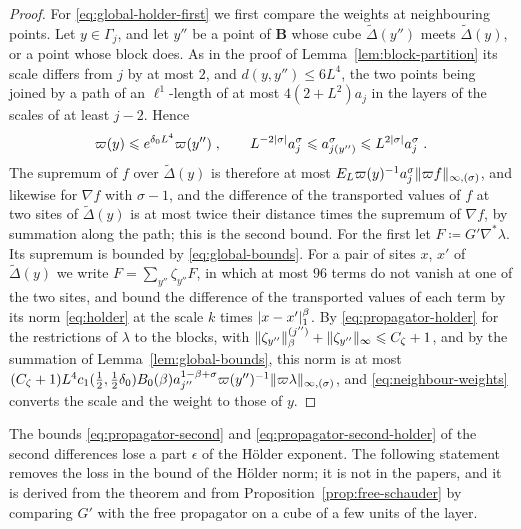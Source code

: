 \documentclass[11pt]{preprint}
\DeclarePairedDelimiter{\abs}{\lvert}{\rvert}
\DeclarePairedDelimiter{\norm}{\lVert}{\rVert}
\numberwithin{equation}{section}
\begin{document}
\begin{proof}
For \eqref{eq:global-holder-first} we first compare the weights at neighbouring points. Let $y \in \Gamma_j$, and let $y''$ be a point of $\mathbf B$ whose cube $\tilde\Delta(y'')$ meets $\tilde\Delta(y)$, or a point whose block does. As in the proof of Lemma~\ref{lem:block-partition} its scale differs from $j$ by at most $2$, and $d(y, y'') \leqslant 6L^4$, the two points being joined by a path of an $\ell^1$-length of at most $4(2 + L^2)a_j$ in the layers of the scales of at least $j - 2$. Hence
\begin{equation}\label{eq:neighbour-weights}
    \varpi(y) \leqslant e^{\delta_0L^4}\varpi(y'')\;,
    \qquad
    L^{-2\abs\sigma}a_j^\sigma \leqslant a_{j(y'')}^\sigma \leqslant L^{2\abs\sigma}a_j^\sigma\;.
\end{equation}
The supremum of $f$ over $\tilde\Delta(y)$ is therefore at most $E_L\varpi(y)^{-1}a_j^\sigma\norm{\varpi f}_{\infty,(\sigma)}$, and likewise for $\nabla f$ with $\sigma - 1$, and the difference of the transported values of $f$ at two sites of $\tilde\Delta(y)$ is at most twice their distance times the supremum of $\nabla f$, by summation along the path; this is the second bound. For the first let $F \coloneqq G'\nabla^*\lambda$. Its supremum is bounded by \eqref{eq:global-bounds}. For a pair of sites $x$, $x'$ of $\tilde\Delta(y)$ we write $F = \sum_{y''}\zeta_{y''}F$, in which at most $96$ terms do not vanish at one of the two sites, and bound the difference of the transported values of each term by its norm \eqref{eq:holder} at the scale $k$ times $\abs{x - x'}_1^\beta$. By \eqref{eq:propagator-holder} for the restrictions of $\lambda$ to the blocks, with $\norm{\zeta_{y''}}^{(j'')}_\beta + \norm{\zeta_{y''}}_\infty \leqslant C_\zeta + 1$, and by the summation of Lemma~\ref{lem:global-bounds}, this norm is at most $(C_\zeta + 1)L^4c_1(\frac{1}{2}, \frac{1}{2}\delta_0)B_0(\beta)a_{j''}^{1-\beta+\sigma}\varpi(y'')^{-1}\norm{\varpi\lambda}_{\infty,(\sigma)}$, and \eqref{eq:neighbour-weights} converts the scale and the weight to those of $y$.
\end{proof}

The bounds \eqref{eq:propagator-second} and \eqref{eq:propagator-second-holder} of the second differences lose a part $\epsilon$ of the H\"older exponent. The following statement removes the loss in the bound of the H\"older norm; it is not in the papers, and it is derived from the theorem and from Proposition~\ref{prop:free-schauder} by comparing $G'$ with the free propagator on a cube of a few units of the layer.
\end{document}
